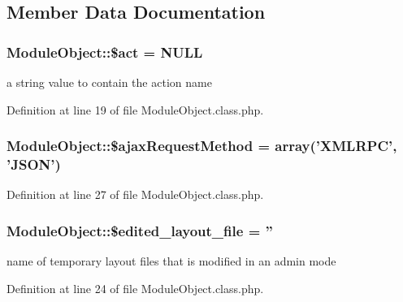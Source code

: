 \subsection{Member Data Documentation}
\hypertarget{classModuleObject_a9d43905d072c53cd5cd239d706215895}{
\subsubsection[{\$act}]{\setlength{\rightskip}{0pt plus 5cm}Module\+Object\+::\$act = N\+U\+L\+L}}\label{classModuleObject_a9d43905d072c53cd5cd239d706215895}


a string value to contain the action name 



Definition at line 19 of file Module\+Object.\+class.\+php.

\hypertarget{classModuleObject_a783d38cb68310dc6e5a1f6c1cc6c6b84}{
\subsubsection[{\$ajax\+Request\+Method}]{\setlength{\rightskip}{0pt plus 5cm}Module\+Object\+::\$ajax\+Request\+Method = array('X\+M\+L\+R\+P\+C', 'J\+S\+O\+N')}}\label{classModuleObject_a783d38cb68310dc6e5a1f6c1cc6c6b84}


Definition at line 27 of file Module\+Object.\+class.\+php.

\hypertarget{classModuleObject_a1fcbb01c627ce5ff104c05f54715bd61}{
\subsubsection[{\$edited\+\_\+layout\+\_\+file}]{\setlength{\rightskip}{0pt plus 5cm}Module\+Object\+::\$edited\+\_\+layout\+\_\+file = ''}}\label{classModuleObject_a1fcbb01c627ce5ff104c05f54715bd61}


name of temporary layout files that is modified in an admin mode 



Definition at line 24 of file Module\+Object.\+class.\+php.

